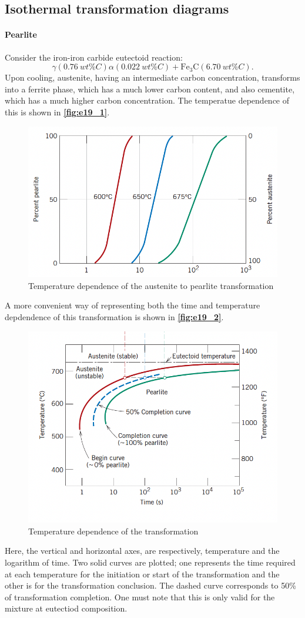 \subsection{Isothermal transformation diagrams}

\paragraph{Pearlite}
Consider the iron-iron carbide eutectoid reaction:
\[ 
\gamma \left( \qty{0,76}{wt \% C} \right) \alpha \left( \qty{0,022}{wt\% C} \right) + \mathrm{Fe}_3 \mathrm{C}\left( \qty{6,70}{wt\% C}  \right)
.\]
Upon cooling, austenite, having an intermediate carbon concentration, transforms into a ferrite phase, which has a much lower carbon content, and also cementite, which has a much higher carbon concentration. The temperatue dependence of this is shown in \textbf{\autoref{fig:e19_1}}.
\begin{figure} [ht]
  \centering
  \includegraphics[width=0.5\linewidth]{./figures/e19_1.png}
  \caption{Temperature dependence of the austenite to pearlite transformation}
  \label{fig:e19_1}
\end{figure}

A more convenient way of representing both the time and temperature depdendence of this transformation is shown in \textbf{\autoref{fig:e19_2}}.
\begin{figure} [ht]
  \centering
  \includegraphics[width=0.5\linewidth]{./figures/e19_2.png}
  \caption{Temperature dependence of the transformation} 
  \label{fig:e19_2}
\end{figure}
Here, the vertical and horizontal axes, are respectively, temperature and the logarithm of time. Two solid curves are plotted; one represents the time required at each temperature for the initiation or start of the transformation and the other is for the transformation conclusion. The dashed curve corresponds to 50\% of transformation completion. One must note that this is only valid for the mixture at eutectiod composition.


